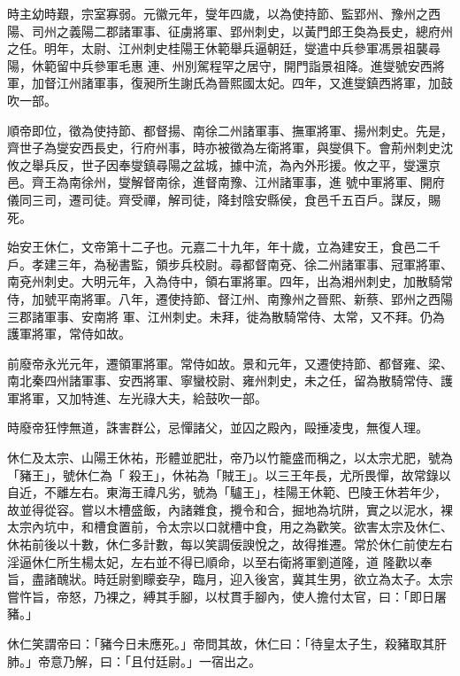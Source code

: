 \begin{pinyinscope}
 時主幼時艱，宗室寡弱。元徽元年，燮年四歲，以為使持節、監郢州、豫州之西陽、司州之義陽二郡諸軍事、征虜將軍、郢州刺史，以黃門郎王奐為長史，總府州之任。明年，太尉、江州刺史桂陽王休範舉兵逼朝廷，燮遣中兵參軍馮景祖襲尋陽，休範留中兵參軍毛惠
 連、州別駕程罕之居守，開門詣景祖降。進燮號安西將軍，加督江州諸軍事，復昶所生謝氏為晉熙國太妃。四年，又進燮鎮西將軍，加鼓吹一部。



 順帝即位，徵為使持節、都督揚、南徐二州諸軍事、撫軍將軍、揚州刺史。先是，齊世子為燮安西長史，行府州事，時亦被徵為左衛將軍，與燮俱下。會荊州刺史沈攸之舉兵反，世子因奉燮鎮尋陽之盆城，據中流，為內外形援。攸之平，燮還京邑。齊王為南徐州，燮解督南徐，進督南豫、江州諸軍事，進
 號中軍將軍、開府儀同三司，遷司徒。齊受禪，解司徒，降封陰安縣侯，食邑千五百戶。謀反，賜死。



 始安王休仁，文帝第十二子也。元嘉二十九年，年十歲，立為建安王，食邑二千戶。孝建三年，為秘書監，領步兵校尉。尋都督南兗、徐二州諸軍事、冠軍將軍、南兗州刺史。大明元年，入為侍中，領右軍將軍。四年，出為湘州刺史，加散騎常侍，加號平南將軍。八年，遷使持節、督江州、南豫州之晉熙、新蔡、郢州之西陽三郡諸軍事、安南將
 軍、江州刺史。未拜，徙為散騎常侍、太常，又不拜。仍為護軍將軍，常侍如故。



 前廢帝永光元年，遷領軍將軍。常侍如故。景和元年，又遷使持節、都督雍、梁、南北秦四州諸軍事、安西將軍、寧蠻校尉、雍州刺史，未之任，留為散騎常侍、護軍將軍，又加特進、左光祿大夫，給鼓吹一部。



 時廢帝狂悖無道，誅害群公，忌憚諸父，並囚之殿內，毆捶凌曳，無復人理。



 休仁及太宗、山陽王休祐，形體並肥壯，帝乃以竹籠盛而稱之，以太宗尤肥，號為「豬王」，號休仁為「
 殺王」，休祐為「賊王」。以三王年長，尤所畏憚，故常錄以自近，不離左右。東海王禕凡劣，號為「驢王」，桂陽王休範、巴陵王休若年少，故並得從容。嘗以木槽盛飯，內諸雜食，攪令和合，掘地為坑阱，實之以泥水，裸太宗內坑中，和槽食置前，令太宗以口就槽中食，用之為歡笑。欲害太宗及休仁、休祐前後以十數，休仁多計數，每以笑調佞諛悅之，故得推遷。常於休仁前使左右淫逼休仁所生楊太妃，左右並不得已順命，以至右衛將軍劉道隆，道
 隆歡以奉旨，盡諸醜狀。時廷尉劉矇妾孕，臨月，迎入後宮，冀其生男，欲立為太子。太宗嘗忤旨，帝怒，乃裸之，縛其手腳，以杖貫手腳內，使人擔付太官，曰：「即日屠豬。」



 休仁笑謂帝曰：「豬今日未應死。」帝問其故，休仁曰：「待皇太子生，殺豬取其肝肺。」帝意乃解，曰：「且付廷尉。」一宿出之。




\end{pinyinscope}

